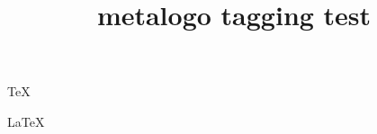 \documentclass{article}
\title{metalogo tagging test}
\begin{document}
\TeX

\LaTeX

\LaTeXe

\XeTeX

\XeLaTeX

\LuaTeX

\LuaLaTeX
\end{document}
